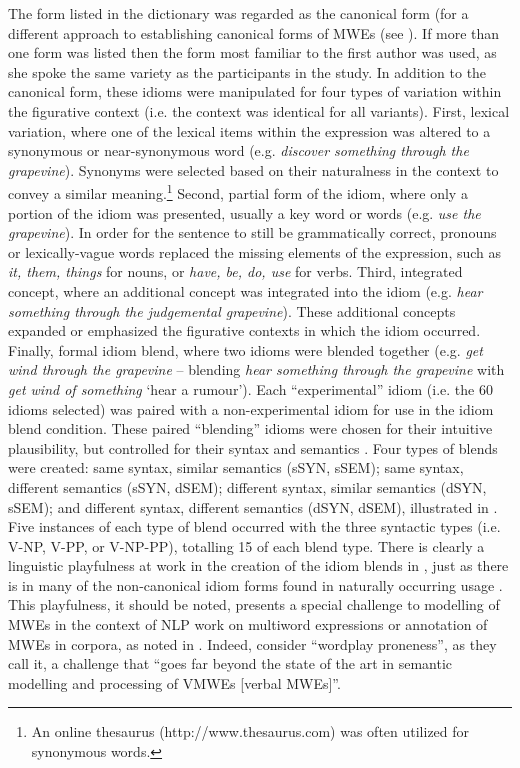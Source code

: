 \documentclass[output=paper,modfonts,nonflat]{langsci/langscibook}
\begin{document}
The form listed in the dictionary was regarded as the canonical form (for a different approach to establishing canonical forms of MWEs (see ). If more than one form was listed then the form most familiar to the first author was used, as she spoke the same variety as the participants in the study. In addition to the canonical form, these idioms were manipulated for four types of variation within the figurative context (i.e. the context was identical for all variants). First, lexical variation, where one of the lexical items within the expression was altered to a synonymous or near-synonymous word (e.g. \textit{discover something through the grapevine}). Synonyms were selected based on their naturalness in the context to convey a similar meaning.\footnote{An online thesaurus (http://www.thesaurus.com) was often utilized for synonymous words.} Second, partial form of the idiom, where only a portion of the idiom was presented, usually a key word or words (e.g. \textit{use the grapevine}). In order for the sentence to still be grammatically correct, pronouns or lexically-vague words replaced the missing elements of the expression, such as \textit{it, them, things} for nouns, or \textit{have, be, do, use} for verbs. Third, integrated concept, where an additional concept was integrated into the idiom (e.g. \textit{hear something through the judgemental grapevine}). These additional concepts expanded or emphasized the figurative contexts in which the idiom occurred. Finally, formal idiom blend, where two idioms were blended together (e.g. \textit{get wind through the grapevine} -- blending \textit{hear something through the grapevine} with \textit{get wind of something} `hear a rumour'). Each ``experimental'' idiom (i.e. the 60 idioms selected) was paired with a non-experimental idiom for use in the idiom blend condition. These paired ``blending'' idioms were chosen for their intuitive plausibility, but controlled for their syntax and semantics \citep{CuttingBock1997}. Four types of blends were created: same syntax, similar semantics (sSYN, sSEM); same syntax, different semantics (sSYN, dSEM); different syntax, similar semantics (dSYN, sSEM); and different syntax, different semantics (dSYN, dSEM), illustrated in . Five instances of each type of blend occurred with the three syntactic types (i.e. V-NP, V-PP, or V-NP-PP), totalling 15 of each blend type. There is clearly a linguistic playfulness at work in the creation of the idiom blends in , just as there is in many of the non-canonical idiom forms found in naturally occurring usage \citep[cf.][]{Moon1998,Duffley2013}. This playfulness, it should be noted, presents a special challenge to modelling of MWEs in the context of NLP work on multiword expressions or annotation of MWEs in corpora, as noted in . Indeed,  consider ``wordplay proneness'', as they call it, a challenge that ``goes far beyond the state of the art in semantic modelling and processing of VMWEs [verbal MWEs]''.
\end{document}
